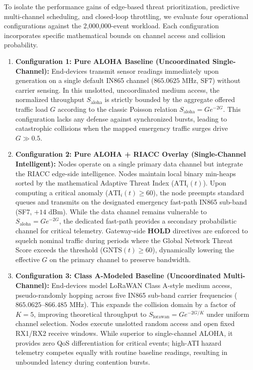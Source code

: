 \documentclass[preprint,review,12pt]{elsarticle}
\begin{document}
\label{sec:eval_configs}

To isolate the performance gains of edge-based threat prioritization, predictive multi-channel scheduling, and closed-loop throttling, we evaluate four operational configurations against the 2,000,000-event workload. Each configuration incorporates specific mathematical bounds on channel access and collision probability.

\begin{enumerate}

    \item \textbf{Configuration 1: Pure ALOHA Baseline (Uncoordinated Single-Channel):} End-devices transmit sensor readings immediately upon generation on a single default IN865 channel ($865.0625\text{ MHz}$, SF7) without carrier sensing. In this unslotted, uncoordinated medium access, the normalized throughput $S_{\text{aloha}}$ is strictly bounded by the aggregate offered traffic load $G$ according to the classic Poisson relation $S_{\text{aloha}} = G e^{-2G}$. This configuration lacks any defense against synchronized bursts, leading to catastrophic collisions when the mapped emergency traffic surges drive $G \gg 0.5$.

    \item \textbf{Configuration 2: Pure ALOHA + RIACC Overlay (Single-Channel Intelligent):} Nodes operate on a single primary data channel but integrate the RIACC edge-side intelligence. Nodes maintain local binary min-heaps sorted by the mathematical Adaptive Threat Index ($\text{ATI}_i(t)$). Upon computing a critical anomaly ($\text{ATI}_i(t) \ge 60$), the node preempts standard queues and transmits on the designated emergency fast-path IN865 sub-band (SF7, $+14\text{ dBm}$). While the data channel remains vulnerable to $S_{\text{aloha}} = G e^{-2G}$, the dedicated fast-path provides a secondary probabilistic channel for critical telemetry. Gateway-side $\textbf{HOLD}$ directives are enforced to squelch nominal traffic during periods where the Global Network Threat Score exceeds the threshold ($\text{GNTS}(t) \ge 60$), dynamically lowering the effective $G$ on the primary channel to preserve bandwidth.

    \item \textbf{Configuration 3: Class A-Modeled Baseline (Uncoordinated Multi-Channel):} End-devices model LoRaWAN Class A-style medium access, pseudo-randomly hopping across five IN865 sub-band carrier frequencies ($865.0625$--$866.485\text{ MHz}$). This expands the collision domain by a factor of $K = 5$, improving theoretical throughput to $S_{\text{lorawan}} = G e^{-2G/K}$ under uniform channel selection. Nodes execute unslotted random access and open fixed RX1/RX2 receive windows. While superior to single-channel ALOHA, it provides zero QoS differentiation for critical events; high-ATI hazard telemetry competes equally with routine baseline readings, resulting in unbounded latency during contention bursts.


\end{enumerate}
\end{document}
